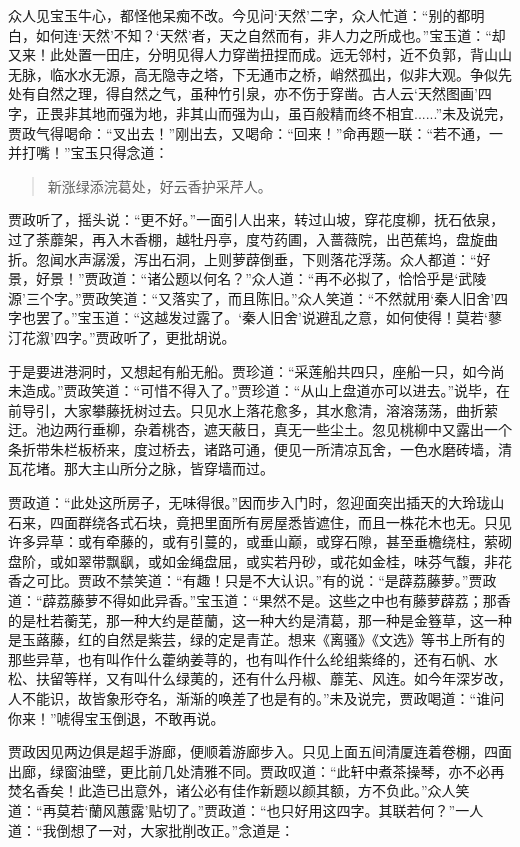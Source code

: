 \documentclass[12pt,oneside]{book}
\newenvironment{shici}{%
\begin{verse}%
\centering\large\hspace{12pt}}%
{\end{verse}}
\begin{document}
众人见宝玉牛心，都怪他呆痴不改。今见问‘天然’二字，众人忙道：“别的都明白，如何连‘天然’不知？‘天然’者，天之自然而有，非人力之所成也。”宝玉道：“却又来！此处置一田庄，分明见得人力穿凿扭捏而成。远无邻村，近不负郭，背山山无脉，临水水无源，高无隐寺之塔，下无通市之桥，峭然孤出，似非大观。争似先处有自然之理，得自然之气，虽种竹引泉，亦不伤于穿凿。古人云‘天然图画’四字，正畏非其地而强为地，非其山而强为山，虽百般精而终不相宜......”未及说完，贾政气得喝命：“叉出去！”刚出去，又喝命：“回来！”命再题一联：“若不通，一并打嘴！”宝玉只得念道：

\begin{shici}
新涨绿添浣葛处，好云香护采芹人。
\end{shici}

贾政听了，摇头说：“更不好。”一面引人出来，转过山坡，穿花度柳，抚石依泉，过了荼蘼架，再入木香棚，越牡丹亭，度芍药圃，入蔷薇院，出芭蕉坞，盘旋曲折。忽闻水声潺湲，泻出石洞，上则萝薜倒垂，下则落花浮荡。众人都道：“好景，好景！”贾政道：“诸公题以何名？”众人道：“再不必拟了，恰恰乎是‘武陵源’三个字。”贾政笑道：“又落实了，而且陈旧。”众人笑道：“不然就用‘秦人旧舍’四字也罢了。”宝玉道：“这越发过露了。‘秦人旧舍’说避乱之意，如何使得！莫若‘蓼汀花溆’四字。”贾政听了，更批胡说。

于是要进港洞时，又想起有船无船。贾珍道：“采莲船共四只，座船一只，如今尚未造成。”贾政笑道：“可惜不得入了。”贾珍道：“从山上盘道亦可以进去。”说毕，在前导引，大家攀藤抚树过去。只见水上落花愈多，其水愈清，溶溶荡荡，曲折萦迂。池边两行垂柳，杂着桃杏，遮天蔽日，真无一些尘土。忽见桃柳中又露出一个条折带朱栏板桥来，度过桥去，诸路可通，便见一所清凉瓦舍，一色水磨砖墙，清瓦花堵。那大主山所分之脉，皆穿墙而过。

贾政道：“此处这所房子，无味得很。”因而步入门时，忽迎面突出插天的大玲珑山石来，四面群绕各式石块，竟把里面所有房屋悉皆遮住，而且一株花木也无。只见许多异草：或有牵藤的，或有引蔓的，或垂山巅，或穿石隙，甚至垂檐绕柱，萦砌盘阶，或如翠带飘飖，或如金绳盘屈，或实若丹砂，或花如金桂，味芬气馥，非花香之可比。贾政不禁笑道：“有趣！只是不大认识。”有的说：“是薜荔藤萝。”贾政道：“薜荔藤萝不得如此异香。”宝玉道：“果然不是。这些之中也有藤萝薜荔；那香的是杜若蘅芜，那一种大约是茞蘭，这一种大约是清葛，那一种是金簦草，这一种是玉蕗藤，红的自然是紫芸，绿的定是青芷。想来《离骚》《文选》等书上所有的那些异草，也有叫作什么藿纳姜荨的，也有叫作什么纶组紫绛的，还有石帆、水松、扶留等样，又有叫什么绿荑的，还有什么丹椒、蘼芜、风连。如今年深岁改，人不能识，故皆象形夺名，渐渐的唤差了也是有的。”未及说完，贾政喝道：“谁问你来！”唬得宝玉倒退，不敢再说。

贾政因见两边俱是超手游廊，便顺着游廊步入。只见上面五间清厦连着卷棚，四面出廊，绿窗油壁，更比前几处清雅不同。贾政叹道：“此轩中煮茶操琴，亦不必再焚名香矣！此造已出意外，诸公必有佳作新题以颜其额，方不负此。”众人笑道：“再莫若‘蘭风蕙露’贴切了。”贾政道：“也只好用这四字。其联若何？”一人道：“我倒想了一对，大家批削改正。”念道是：
\end{document}
